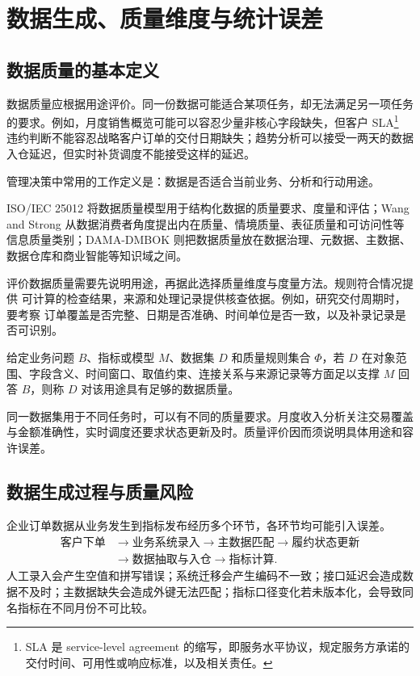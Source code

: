\section{数据生成、质量维度与统计误差}
\subsection{数据质量的基本定义}

数据质量应根据用途评价。同一份数据可能适合某项任务，却无法满足另一项任务的要求。例如，月度销售概览可能可以容忍少量非核心字段缺失，但客户 SLA\footnote{SLA 是 service-level agreement 的缩写，即服务水平协议，规定服务方承诺的交付时间、可用性或响应标准，以及相关责任。} 违约判断不能容忍战略客户订单的交付日期缺失；趋势分析可以接受一两天的数据入仓延迟，但实时补货调度不能接受这样的延迟。

管理决策中常用的工作定义是：数据是否适合当前业务、分析和行动用途。

ISO/IEC 25012 将数据质量模型用于结构化数据的质量要求、度量和评估；Wang and Strong 从数据消费者角度提出内在质量、情境质量、表征质量和可访问性等信息质量类别；DAMA-DMBOK 则把数据质量放在数据治理、元数据、主数据、数据仓库和商业智能等知识域之间。

评价数据质量需要先说明用途，再据此选择质量维度与度量方法。规则符合情况提供
可计算的检查结果，来源和处理记录提供核查依据。例如，研究交付周期时，要考察
订单覆盖是否完整、日期是否准确、时间单位是否一致，以及补录记录是否可识别。

\begin{definition}[用途适配的数据质量]
给定业务问题 \(B\)、指标或模型 \(M\)、数据集 \(D\) 和质量规则集合 \(\Phi\)，若 \(D\) 在对象范围、字段含义、时间窗口、取值约束、连接关系与来源记录等方面足以支撑 \(M\) 回答 \(B\)，则称 \(D\) 对该用途具有足够的数据质量。
\end{definition}

同一数据集用于不同任务时，可以有不同的质量要求。月度收入分析关注交易覆盖与金额准确性，实时调度还要求状态更新及时。质量评价因而须说明具体用途和容许误差。

\subsection{数据生成过程与质量风险}

企业订单数据从业务发生到指标发布经历多个环节，各环节均可能引入误差。
\[
\begin{aligned}
\text{客户下单}
&\rightarrow
\text{业务系统录入}
\rightarrow
\text{主数据匹配}
\rightarrow
\text{履约状态更新}\\
&\rightarrow
\text{数据抽取与入仓}
\rightarrow
\text{指标计算}.
\end{aligned}
\]
人工录入会产生空值和拼写错误；系统迁移会产生编码不一致；接口延迟会造成数据不及时；主数据缺失会造成外键无法匹配；指标口径变化若未版本化，会导致同名指标在不同月份不可比较。

